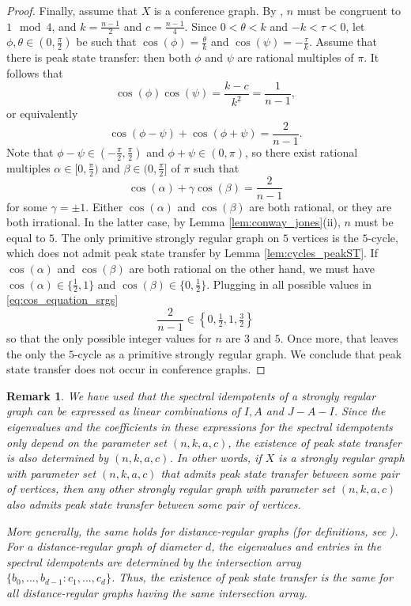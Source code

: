 \documentclass{article}
\newtheorem{remark}[theorem]{Remark}
\numberwithin{equation}{section}
\begin{document}
\begin{proof}
Finally, assume that $X$ is a conference graph. By \cite{GodRoy2001}, $n$ must be congruent to $1 \mod 4$, and $k = \frac{n-1}{2}$ and $c = \frac{n-1}{4}$. Since $0 < \theta < k$ and $-k < \tau < 0$, let $\phi,\theta \in (0,\frac{\pi}{2})$ be such that $\cos(\phi)= \frac{\theta}{k}$ and $\cos(\psi) = -\frac{\tau}{k}$. 
Assume that there is peak state transfer: then both $\phi$ and $\psi$ are rational multiples of $\pi$. It follows that
\[
\cos(\phi)\cos(\psi) = \frac{k-c}{k^2} = \frac{1}{n-1},
\]
or equivalently
\[
\cos(\phi - \psi) + \cos(\phi + \psi) = \frac{2}{n-1}.
\]
Note that $\phi - \psi \in (-\frac{\pi}{2},\frac{\pi}{2})$ and $\phi + \psi \in (0,\pi)$, so there exist rational multiples $\alpha \in [0,\frac{\pi}{2})$ and $\beta \in (0,\frac{\pi}{2}]$ of $\pi$ such that
\begin{equation}
\label{eq:cos_equation_srgs}
\cos(\alpha) + \gamma\cos(\beta) = \frac{2}{n-1}
\end{equation}
for some $\gamma = \pm 1$. Either $\cos(\alpha)$ and $\cos(\beta)$ are both rational, or they are both irrational. In the latter case, by Lemma \ref{lem:conway_jones}(ii), $n$ must be equal to $5$. The only primitive strongly regular graph on $5$ vertices is the $5$-cycle, which does not admit peak state transfer by Lemma \ref{lem:cycles_peakST}. If $\cos(\alpha)$ and $\cos(\beta)$ are both rational on the other hand, we must have $\cos(\alpha) \in \{\frac{1}{2},1\}$ and $\cos(\beta) \in \{0,\frac{1}{2}\}$. Plugging in all possible values in \eqref{eq:cos_equation_srgs}
\[
\frac{2}{n-1} \in \left\{0,\tfrac{1}{2},1,\tfrac{3}{2}\right\}
\]
so that the only possible integer values for $n$ are $3$ and $5$. Once more, that leaves the only the $5$-cycle as a primitive strongly regular graph. We conclude that peak state transfer does not occur in conference graphs.
\end{proof}



\begin{remark}\label{rem:DRGs}
We have used that the spectral idempotents of a strongly regular graph can be expressed as linear combinations of $I, A$ and $J-A-I$. Since the eigenvalues and the coefficients in these expressions for the spectral idempotents only depend on the parameter set $(n,k,a,c)$, the existence of peak state transfer is also determined by $(n,k,a,c)$. In other words, if $X$ is a strongly regular graph with parameter set $(n,k,a,c)$ that admits peak state transfer between some pair of vertices, then any other strongly regular graph with parameter set $(n,k,a,c)$ also admits peak state transfer between some pair of vertices. 

More generally, the same holds for distance-regular graphs (for definitions, see \cite{BroCohNeu1989}). For a distance-regular graph of diameter $d$, the eigenvalues and entries in the spectral idempotents are determined by the intersection array $\{b_0,\ldots,b_{d-1}:c_1,\ldots, c_d\}$. Thus, the existence of peak state transfer is the same for all distance-regular graphs having the same intersection array. 
\end{remark}
\end{document}
